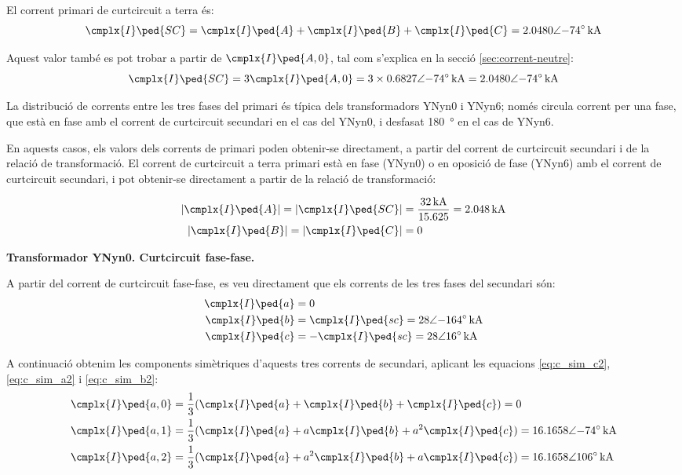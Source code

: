 \begin{exemple}[\CCasimSecTrafo{}]
    El corrent primari de curtcircuit a terra és:
    \[
        \cmplx{I}\ped{SC} = \cmplx{I}\ped{A} + \cmplx{I}\ped{B} + \cmplx{I}\ped{C} = \complexqty{2,0480:-74}{kA}
    \]

    Aquest valor també es pot trobar a partir de $\cmplx{I}\ped{A,0}$, tal com s'explica en la secció \vref{sec:corrent-neutre}:
       \[
        \cmplx{I}\ped{SC} = 3 \cmplx{I}\ped{A,0} = 3 \times \complexqty{0,6827:-74}{kA} = \complexqty{2,0480:-74}{kA}
    \]

    La distribució de corrents entre les tres fases del primari és típica dels transformadors YNyn0 i YNyn6; només circula corrent per una fase, que està en fase amb el corrent de curtcircuit secundari en el cas del YNyn0, i desfasat \qty{180}{\degree} en el cas de YNyn6.

    En aquests casos, els valors dels corrents de primari poden obtenir-se directament, a partir del corrent de curtcircuit secundari i de la relació de transformació. El corrent de curtcircuit a terra primari està en fase (YNyn0) o en oposició de fase (YNyn6) amb el corrent de curtcircuit secundari, i pot obtenir-se directament a partir de la relació de transformació:
    
    \begin{align*}
        |\cmplx{I}\ped{A}|  = |\cmplx{I}\ped{SC}| &= \frac{\qty{32}{kA}}{\num{15,625}} = \qty{2,048}{kA} \\
        |\cmplx{I}\ped{B}| = |\cmplx{I}\ped{C}| &=  0
    \end{align*}


    \textbf{ Transformador YNyn0. Curtcircuit fase-fase.}

    \begin{center}
       
    \end{center}

    A partir del corrent de curtcircuit fase-fase, es veu directament que els corrents de les tres fases del secundari són:
    \begin{align*}
        \cmplx{I}\ped{a} &= 0  \\
        \cmplx{I}\ped{b} &= \cmplx{I}\ped{sc} = \complexqty{28:-164}{kA}  \\
        \cmplx{I}\ped{c} &= -\cmplx{I}\ped{sc} = \complexqty{28:16}{kA}
    \end{align*}

    A continuació obtenim les components simètriques d'aquests tres corrents de secundari, aplicant les equacions \eqref{eq:c_sim_c2}, \eqref{eq:c_sim_a2} i \eqref{eq:c_sim_b2}:
    \begin{align*}
        \cmplx{I}\ped{a,0} &= \frac{1}{3} (\cmplx{I}\ped{a} + \cmplx{I}\ped{b} +
        \cmplx{I}\ped{c}) = 0 \\
        \cmplx{I}\ped{a,1} &= \frac{1}{3} (\cmplx{I}\ped{a} + a \cmplx{I}\ped{b} +
         a^2 \cmplx{I}\ped{c}) = \complexqty{16,1658:-74}{kA}  \\
        \cmplx{I}\ped{a,2} &= \frac{1}{3} (\cmplx{I}\ped{a} + a^2 \cmplx{I}\ped{b} +
         a \cmplx{I}\ped{c}) = \complexqty{16,1658:106}{kA}
    \end{align*}


\end{exemple}

